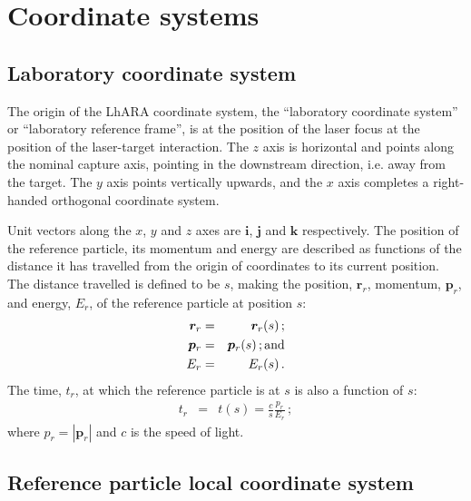 \graphicspath{ {02-CoordinateSystems/Figures/} }

\section{Coordinate systems}

\subsection{Laboratory coordinate system}

The origin of the LhARA coordinate system, the ``laboratory coordinate
system'' or ``laboratory reference frame'', is at the position of the
laser focus at the position of the laser-target interaction.
The $z$ axis is horizontal and points along the nominal capture axis,
pointing in the downstream direction, i.e. away from the target.
The $y$ axis points vertically upwards, and the $x$ axis completes a
right-handed orthogonal coordinate system. 

Unit vectors along the $x$, $y$ and $z$ axes are $\bm{i}$, $\bm{j}$
and $\bm{k}$ respectively.
The position of the reference particle, its momentum and energy are
described as functions of the distance it has travelled from the origin
of coordinates to its current position.
The distance travelled is defined to be $s$, making the position,
$\bm{r}_r$, momentum, $\bm{p}_r$, and energy, $E_r$, of the
reference particle at position $s$:
\begin{eqnarray}
  \bm{r}_r & = & \bm{r}_r(s)\, ;           \nonumber \\
  \bm{p}_r & = & \bm{p}_r(s)\, {\rm ; and}           \\
       E_r & = &      E_r(s)\, .           \nonumber
\end{eqnarray}
The time, $t_r$, at which the reference particle is at $s$ is also a
function of $s$:
\begin{eqnarray}
        t_r  & = & t(s) = \frac{c}{s} \frac{p_r}{E_r}\, ; 
\end{eqnarray}
where $p_r=\left|\bm{p}_r\right|$ and $c$ is the speed of light.

\subsection{Reference particle local coordinate system}

